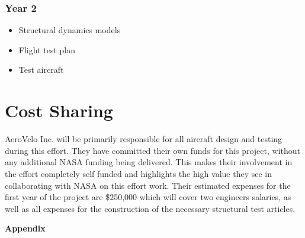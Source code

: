 \documentclass[]{aiaa-tc}
\begin{document}
        \subsubsection{Year 2}
            \begin{itemize}
                \item Structural dynamics models 
                \item Flight test plan
                \item Test aircraft
            \end{itemize}


  \section{Cost Sharing}
    AeroVelo Inc. will be primarily responsible for all aircraft design and testing during this effort. 
    They have committed their own funds for this project, without any additional NASA funding being delivered.
    This makes their involvement in the effort completely self funded and highlights the high value they see 
    in collaborating with NASA on this effort work. Their estimated expenses for the first year of the project are \$250,000 
    which will cover two engineers salaries, as well as all expenses for the construction of the necessary 
    structural test articles.



  \clearpage
  

  \appendix

  \clearpage
  \centerline{\huge{\textbf{Appendix}}}
\end{document}
